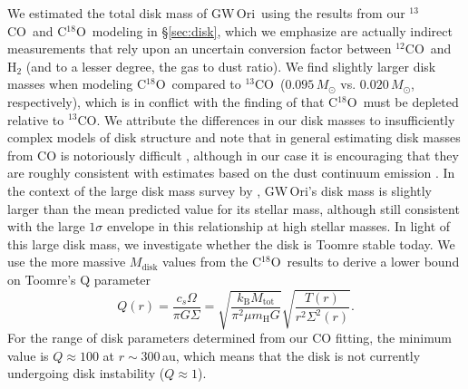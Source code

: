 \documentclass[twocolumn]{aastex61}
\newcommand{\obj}{GW\,Ori}
\newcommand{\twelve}{${}^{12}$CO}
\newcommand{\thirteen}{${}^{13}$CO}
\newcommand{\eighteen}{C${}^{18}$O}
\begin{document}
We estimated the total disk mass of \obj\ using the results from our \thirteen\ and \eighteen\ modeling in \S\ref{sec:disk}, which we emphasize are actually indirect measurements that rely upon an uncertain conversion factor between \twelve\ and $\mathrm{H}_2$ (and to a lesser degree, the gas to dust ratio). We find slightly larger disk masses when modeling \eighteen\ compared to \thirteen\ ($0.095\,M_\odot$ vs. $0.020\,M_\odot$, respectively), which is in conflict with the finding of \citet{fang17} that \eighteen\ must be depleted relative to \thirteen. We attribute the differences in our disk masses to insufficiently complex models of disk structure and note that in general estimating disk masses from CO is notoriously difficult \citep{yu17}, although in our case it is encouraging that they are roughly consistent with estimates based on the dust continuum emission \citep[$0.1\,M_\sun$;][]{fang17}.
In the context of the large disk mass survey by \citet{andrews13}, \obj's disk mass is slightly larger than the mean predicted value for its stellar mass, although still consistent with the large $1\sigma$ envelope in this relationship at high stellar masses.
In light of this large disk mass, we investigate whether the disk is Toomre stable today. We use the more massive $M_\mathrm{disk}$ values from the \eighteen\ results to derive a lower bound on Toomre's Q parameter
\begin{equation}
Q(r) = \frac{c_s \Omega}{\pi G \Sigma} = \sqrt{\frac{k_\mathrm{B} M_\mathrm{tot}}{\pi^2 \mu m_\mathrm{H} G}} \sqrt{\frac{T(r)}{r^2 \Sigma^2(r)}}.
\end{equation}
For the range of disk parameters determined from our CO fitting, the minimum value is $Q \approx 100$ at $r \sim 300\,$au, which means that the disk is not currently undergoing disk instability ($Q \approx 1$).
\end{document}
